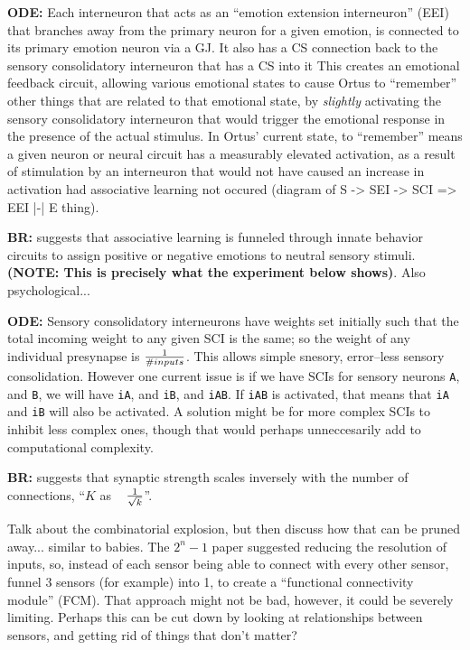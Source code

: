 \documentclass[letterpaper]{article}
\begin{document}
\textbf{ODE:} Each interneuron that acts as an ``emotion extension interneuron'' (EEI) that branches away from the primary neuron for a given emotion, is connected to its primary emotion neuron via a GJ.
It also has a CS connection back to the sensory consolidatory interneuron that has a CS into it
This creates an emotional feedback circuit, allowing various emotional states to cause Ortus to ``remember'' other things that are related to that emotional state, by \textit{slightly} activating the sensory consolidatory interneuron that would trigger the emotional response in the presence of the actual stimulus. In Ortus' current state, to ``remember'' means a given neuron or neural circuit has a measurably elevated activation, as a result of stimulation by an interneuron that would not have caused an increase in activation  had associative learning not occured (diagram of S -> SEI -> SCI => EEI |-| E thing).

\textbf{BR:} \citet{Gore2015} suggests that associative learning is funneled through innate behavior circuits to assign positive or negative emotions to neutral sensory stimuli. \textbf{(NOTE: This is precisely what the experiment below shows)}. Also psychological...

\textbf{ODE:} Sensory consolidatory interneurons have weights set initially such that the total incoming weight to any given SCI is the same; so the weight of any individual presynapse is $ 1 \over {\#inputs}$. This allows simple snesory, error--less sensory consolidation. However one current issue is if we have SCIs for sensory neurons \texttt{A}, and \texttt{B}, we will have \texttt{iA}, and \texttt{iB}, and \texttt{iAB}. If \texttt{iAB} is activated, that means that \texttt{iA} and \texttt{iB} will also be activated. A solution might be for more complex SCIs to inhibit less complex ones, though that would perhaps unneccesarily add to computational complexity.


\textbf{BR:} \citet{Barral2016} suggests that synaptic strength scales inversely with the number of connections, ``$K$ as ~ $1 \over \sqrt{k}$''. 


Talk about the combinatorial explosion, but then discuss how that can be pruned away... similar to babies. The $2^n - 1$ paper suggested reducing the resolution of inputs, so, instead of each sensor being able to connect with every other sensor, funnel 3 sensors (for example) into 1, to create a ``functional connectivity module'' (FCM). That approach might not be bad, however, it could be severely limiting. Perhaps this can be cut down by looking at relationships between sensors, and getting rid of things that don't matter?
\end{document}

